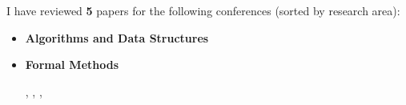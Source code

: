 
I have reviewed {\bf 5} papers for the following conferences (sorted by research area):

\smallskip

\begin{itemize}
\item[] {\bf Algorithms and Data Structures}

  \smallskip


  \medskip

\item[] {\bf Formal Methods}

  \smallskip

  , , , 

\end{itemize}
